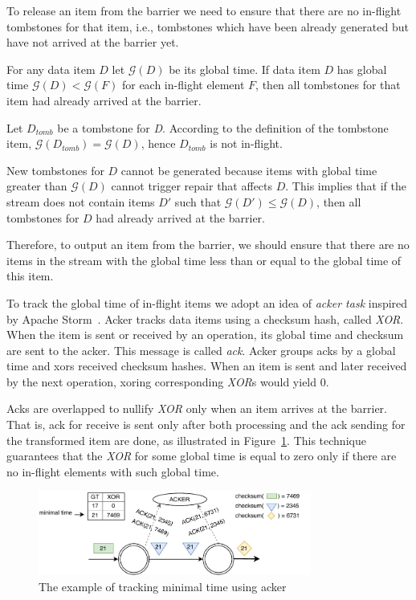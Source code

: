 To release an item from the barrier we need to ensure that there are no in-flight tombstones for that item, i.e., tombstones which have been already generated but have not arrived at the barrier yet.


\begin{theorem}
  For any data item $D$ let $\mathcal{G} (D)$ be its global time. If data item $D$ has global time $\mathcal{G} (D) < \mathcal{G} (F)$ for each in-flight element $F$, then all tombstones for that item had already arrived at the barrier.
\end{theorem}

\begin{sketch}
  Let $D_{tomb}$ be a tombstone for {\it D}. According to the definition of the tombstone item, $\mathcal{G} (D_{tomb}) = \mathcal{G} (D)$, hence $D_{tomb}$ is not in-flight.
  
  New tombstones for $D$ cannot be generated because items with global time greater than $\mathcal{G} (D)$ cannot trigger repair that affects $D$. This implies that if the stream does not contain items $D\prime$ such that $\mathcal{G} (D\prime) \le \mathcal{G} (D)$, then all tombstones for $D$ had already arrived at the barrier.
\end{sketch}

Therefore, to output an item from the barrier, we should ensure that there are no items in the stream with the global time less than or equal to the global time of this item.

To track the global time of in-flight items we adopt an idea of {\it acker task} inspired by Apache Storm~\cite{apache:storm}. Acker tracks data items using a checksum hash, called {\it XOR}. When the item is sent or received by an operation, its global time and checksum are sent to the acker. This message is called {\it ack}. Acker groups acks by a global time and xors received checksum hashes. When an item is sent and later received by the next operation, xoring corresponding {\it XOR}s would yield 0.

Acks are overlapped to nullify {\it XOR} only when an item arrives at the barrier. That is, ack for receive is sent only after both processing and the ack sending for the transformed item are done, as illustrated in Figure~\ref{acker}. This technique guarantees that the {\it XOR} for some global time is equal to zero only if there are no in-flight elements with such global time.

\begin{figure}[t]
  \centering
  \includegraphics[width=0.8\textwidth]{Chapters/DeterministicModelRuntime/pics/acker.pdf}
  \caption{The example of tracking minimal time using acker}
  \label {acker}
\end{figure}

